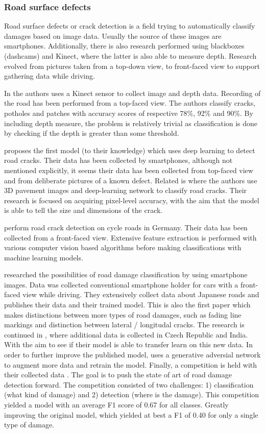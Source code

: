 \subsubsection{Road surface defects}
Road surface defects or crack detection is a field trying to automatically classify damages based on image data. Usually the source of these images are smartphones. Additionally, there is also research performed using blackboxes (dashcams) and Kinect, where the latter is also able to measure depth. Research evolved from pictures taken from a top-down view, to front-faced view to support gathering data while driving.

In  the authors uses a Kinect sensor to collect image and depth data. Recording of the road has been performed from a top-faced view. The authors classify cracks, potholes and patches with accuracy scores of respective 78\%, 92\% and 90\%. By including depth measure, the problem is relatively trivial as classification is done by checking if the depth is greater than some threshold. 

 proposes the first model (to their knowledge) which uses deep learning to detect road cracks. Their data has been collected by smartphones, although not mentioned explicitly, it seems their data has been collected from top-faced view and from deliberate pictures of a known defect. Related is  where the authors use 3D pavement images and deep-learning network to classify road cracks. Their research is focused on acquiring pixel-level accuracy, with the aim that the model is able to tell the size and dimensions of the crack.

 perform road crack detection on cycle roads in Germany. Their data has been collected from a front-faced view. Extensive feature extraction is performed with various computer vision based algorithms before making classifications with machine learning models. 

 researched the possibilities of road damage classification by using smartphone images. Data was collected conventional smartphone holder for cars with a front-faced view while driving. They extensively collect data about Japanese roads and publishes their data and their trained model. This is also the first paper which makes distinctions between more types of road damages, such as fading line markings and distinction between lateral / longitudal cracks. The research is continued in , where additional data is collected in Czech Republic and India. With the aim to see if their model is able to transfer learn on this new data. In order to further improve the published model,  uses a generative adversial network to augment more data and retrain the model. Finally, a competition is held with their collected data \cite{Arya2020-competition}. The goal is to push the state of art of road damage detection forward. The competition consisted of two challenges: 1) classification (what kind of damage) and 2) detection (where is the damage). This competition yielded a model with an average F1 score of 0.67 for all classes. Greatly improving the original model, which yielded at best a F1 of 0.40 for only a single type of damage.

